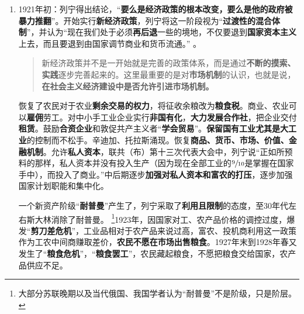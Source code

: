 \begin{enumerate}
  《一个大国的崛起与崩溃》认为战时共产主义初始时具有政治、战时经济的\textbf{客观合理性}。但是随后的\textbf{军事管制}则是向共产主义过渡的一次\textbf{失败的主观尝试}。

  \begin{quotation}由于我们\textbf{企图过渡到共产主义}。到1921年春天我们就在经济战线上遭受了\textbf{严重的失败}，这次失败比高尔察克、邓尼金或皮尔苏茨基使我们遭受的任何失败都要\textbf{严重得多，危险得多}。这次失败表现在：我们上层制定的经济政策同下层脱节，它没有促成生产力的提高， 而提高生产力本是我们党纲规定的紧迫的基本任务。
  \end{quotation}

\item 1921年初：列宁得出结论，“\textbf{要么是经济政策的根本改变，要么是他的政府被暴力推翻}”。开始实行\textbf{新经济政策}，列宁将这一阶段视为“\textbf{过渡性的混合体制}”，并认为“现在我们处于必须\textbf{再后退}一些的境地，不仅要退到\textbf{国家资本主义}上去，而且要退到由国家调节商业和货币流通。” 。


  \begin{quotation}新经济政策并不是一开始就是完善的政策体系，而是通过\textbf{不断的摸索、实践}逐步完善起来的。这里最重要的是对\textbf{市场机制}的认识，也就是说，\textbf{在社会主义经济建设中是否允许引进市场机制。}
  \end{quotation}

  恢复了农民对于农业\textbf{剩余交易的权力}，将征收余粮改为\textbf{粮食税}。商业、农业可以\textbf{雇佣}劳工。对中小手工业企业实行\textbf{非国有化}，\textbf{大力发展合作社}，把企业交付\textbf{租赁}。鼓励\textbf{合资企业}和敦促共产主义者“\textbf{学会贸易}”。\textbf{保留国有工业尤其是大工业}的控制而不松手。辛迪加、托拉斯涌现。恢复\textbf{商品、货币、市场、价值、金融机制}。允许\textbf{私人资本}，联共（布）第十三次代表大会中，列宁说“正如所预料的那样，私人资本并没有投入生产（因为现在全部工业的$\sfrac{9}{10}$是掌握在国家手中），而投入了商业。”中后期逐步\textbf{加强对私人资本和富农的打压}，逐步加强国家计划职能和集中化。

  一个新资产阶级“\textbf{耐普曼}”产生了，列宁采取了\textbf{利用且限制}的态度，至30年代左右斯大林消除了耐普曼。 \footnote{大部分苏联晚期以及当代俄国、我国学者认为“耐普曼”不是阶级，只是阶层。}1923年，因国家对工、农产品价格的调控过度，爆发“\textbf{剪刀差危机}”，工业品相对于农产品来说过高，富农、投机商利用这一政策作为工农中间商赚取差价，\textbf{农民不愿在市场出售粮食}。1927年末到1928年春又发生了“\textbf{粮食危机}”，“\textbf{粮食罢工}”，农民藏起粮食，不愿把粮食交给国家，农产品供应不足。

\end{enumerate}

